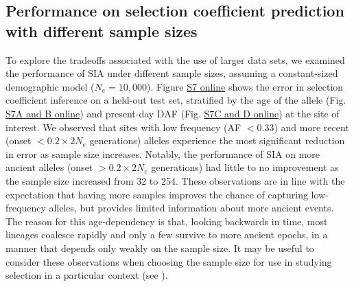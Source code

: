 \subsection{Performance on selection coefficient prediction with different sample sizes}
To explore the tradeoffs associated with the use of larger data sets, we examined the performance of \ac{SIA} under different sample sizes, assuming a constant-sized demographic model ($N_e = 10,000$). Figure \href{https://academic.oup.com/mbe/article/39/1/msab332/6433161#supplementary-data}{S7 online} shows the error in selection coefficient inference on a held-out test set, stratified by the age of the allele (Fig. \href{https://academic.oup.com/mbe/article/39/1/msab332/6433161#supplementary-data}{S7A and B online}) and present-day \ac{DAF} (Fig. \href{https://academic.oup.com/mbe/article/39/1/msab332/6433161#supplementary-data}{S7C and D online}) at the site of interest. We observed that sites with low frequency (\ac{AF} $<0.33$) and more recent (onset $<0.2\times 2N_e$ generations) alleles experience the most significant reduction in error as sample size increases. Notably, the performance of \ac{SIA} on more ancient alleles (onset $>0.2\times 2N_e$ generations) had little to no improvement as the sample size increased from 32 to 254. These observations are in line with the expectation that having more samples improves the chance of capturing low-frequency alleles, but provides limited information about more ancient events. The reason for this age-dependency is that, looking backwards in time, most lineages coalesce rapidly and only a few survive to more ancient epochs, in a manner that depends only weakly on the sample size. It may be useful to consider these observations when choosing the sample size for use in studying selection in a particular context (see ).

